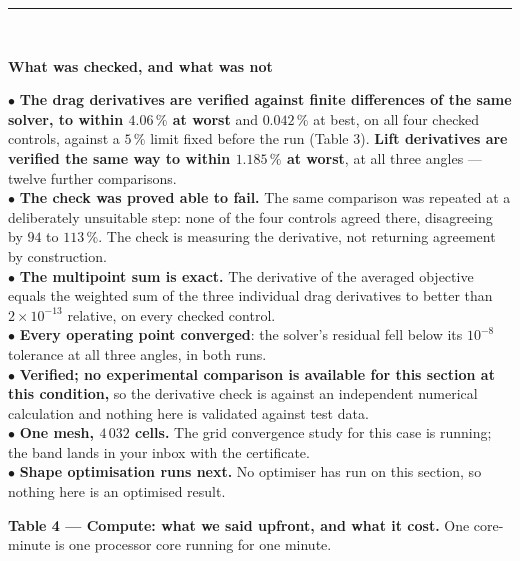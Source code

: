 \documentclass[9pt,a4paper]{article}
\renewcommand{\footnotesize}{\fontsize{6.4}{6.85}\selectfont}
\begin{document}
\vspace{2pt}
{\color{rulegrey}\rule{\textwidth}{0.5pt}}\\[1pt]
\begin{minipage}[t]{0.605\textwidth}
\textbf{What was checked, and what was not}

\vspace{1pt}
{\footnotesize
$\bullet$ \textbf{The drag derivatives are verified against finite differences
of the same solver, to within $4.06\,\%$ at worst} and $0.042\,\%$ at best, on
all four checked controls, against a $5\,\%$ limit fixed before the run
(Table 3). \textbf{Lift derivatives are verified the same way to within
$1.185\,\%$ at worst}, at all three angles --- twelve further comparisons.\\
$\bullet$ \textbf{The check was proved able to fail.} The same comparison was
repeated at a deliberately unsuitable step: none of the four controls agreed
there, disagreeing by $94$ to $113\,\%$. The check is measuring the derivative,
not returning agreement by construction.\\
$\bullet$ \textbf{The multipoint sum is exact.} The derivative of the averaged
objective equals the weighted sum of the three individual drag derivatives to
better than $2\times10^{-13}$ relative, on every checked control.\\
$\bullet$ \textbf{Every operating point converged}: the solver's residual fell
below its $10^{-8}$ tolerance at all three angles, in both runs.\\
$\bullet$ \textbf{Verified; no experimental comparison is available for this
section at this condition,} so the derivative check is against an independent
numerical calculation and nothing here is validated against test data.\\
$\bullet$ \textbf{One mesh, $4\,032$ cells.} The grid convergence study for this
case is running; the band lands in your inbox with the certificate.\\
$\bullet$ \textbf{Shape optimisation runs next.} No optimiser has run on this
section, so nothing here is an optimised result.}

\vspace{3pt}
\textbf{Table 4 --- Compute: what we said upfront, and what it cost.}
One core-minute is one processor core running for one minute.


\end{minipage}
\end{document}

